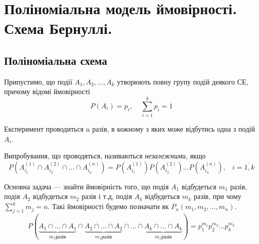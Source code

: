 
\section{Поліноміальна модель ймовірності. Схема Бернуллі.}
\subsection{Поліноміальна схема}
Припустимо, що події $A_1, A_2, \dots, A_k$ утворюють повну групу подій деякого 
СЕ, причому відомі ймовірності $$P(A_i) = p_i,\;\;\;\; \sum_{i=1}^k p_i = 1$$

Експеримент проводиться n разів, в кожному з яких може відбутись одна з 
подій $A_i$. 
\begin{definition}
    Випробування, що проводяться, називаються \emph{незалежними}, якщо 
    $$P(A_{i_1}^{(1)} \cap A_{i_2}^{(2)} \cap \dots \cap A_{i_n}^{(n)}) = 
    P(A_{i_1}^{(1)}) P(A_{i_2}^{(2)}) \dots P(A_{i_n}^{(n)}),\;\;\;
    i=\overline{1,k}$$
\end{definition}

Основна задача --- знайти ймовірність того, що подія $A_1$ відбудеться $m_1$ разів, 
подія $A_2$ відбудеться $m_2$ разів і т.д, подія $A_k$ відбудеться $m_k$ разів, при 
чому $\sum_{j=1}^k m_j = n$. Такі ймовірності будемо позначати як $P_n(m_1, m_2, \dots, m_n)$.
$$P(\underbrace{A_1 \cap \dots \cap A_1}_{m_1 \text{разів}} 
\cap \underbrace{ A_2 \cap \dots \cap A_2}_{m_1 \text{разів}}
\cap \dots \cap  \underbrace{A_k \cap \dots \cap A_k}_{m_1 \text{разів}})
= p_1^{m_1} p_2^{m_2} \dots p_k^{m_k}$$

